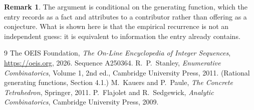 \documentclass[11pt,a4paper]{article}
\theoremstyle{plain}
\theoremstyle{definition}
\newtheorem{remark}[theorem]{Remark}
\begin{document}
\begin{remark}
The argument is conditional on the generating function, which the entry records as a fact and
attributes to a contributor rather than offering as a conjecture. What is shown here is that
the empirical recurrence is not an independent guess: it is equivalent to information the
entry already contains.
\end{remark}

\begin{thebibliography}{9}
 The OEIS Foundation, \emph{The On-Line Encyclopedia of Integer
Sequences}, \url{https://oeis.org}, 2026. Sequence A250364.
 R.~P.~Stanley, \emph{Enumerative Combinatorics}, Volume 1, 2nd ed.,
Cambridge University Press, 2011. (Rational generating functions, Section 4.1.)
 M.~Kauers and P.~Paule, \emph{The Concrete Tetrahedron}, Springer, 2011.
 P.~Flajolet and R.~Sedgewick, \emph{Analytic Combinatorics}, Cambridge
University Press, 2009.
\end{thebibliography}
\end{document}
